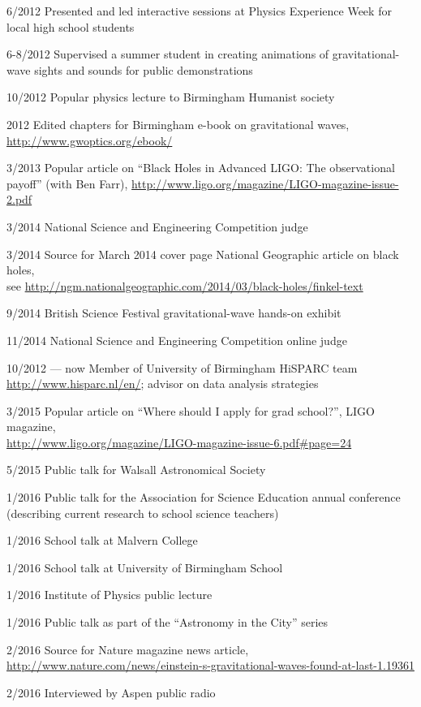 \documentclass[margin,line]{res}
\begin{document}
\begin{resume}
6/2012	Presented and led interactive sessions at Physics Experience Week for local high school students

6-8/2012	Supervised a summer student in creating animations of gravitational-wave sights and sounds for public demonstrations

10/2012	Popular physics lecture to Birmingham Humanist society

2012		Edited chapters for Birmingham e-book on gravitational waves, \url{http://www.gwoptics.org/ebook/}
	  
3/2013	Popular article on ``Black Holes in Advanced LIGO: The observational payoff'' (with Ben Farr), \url{http://www.ligo.org/magazine/LIGO-magazine-issue-2.pdf}

3/2014	National Science and Engineering Competition judge

3/2014	Source for March 2014 cover page National Geographic article on black holes,\\ see \url{http://ngm.nationalgeographic.com/2014/03/black-holes/finkel-text}

9/2014	British Science Festival gravitational-wave hands-on exhibit

11/2014	National Science and Engineering Competition online judge

10/2012 --- now 	Member of University of Birmingham HiSPARC team \url{http://www.hisparc.nl/en/}; advisor on data analysis strategies

3/2015	Popular article on ``Where should I apply for grad school?'', LIGO magazine,\\ \url{http://www.ligo.org/magazine/LIGO-magazine-issue-6.pdf\#page=24}

5/2015 	Public talk for Walsall Astronomical Society

1/2016	Public talk for the Association for Science Education annual conference (describing current research to school science teachers)

1/2016 	School talk at Malvern College

1/2016 	School talk at University of Birmingham School

1/2016	Institute of Physics public lecture

1/2016	Public talk as part of the ``Astronomy in the City'' series

2/2016	Source for Nature magazine news article,\\ \url{http://www.nature.com/news/einstein-s-gravitational-waves-found-at-last-1.19361}

2/2016	Interviewed by Aspen public radio


\end{resume}
\end{document}
